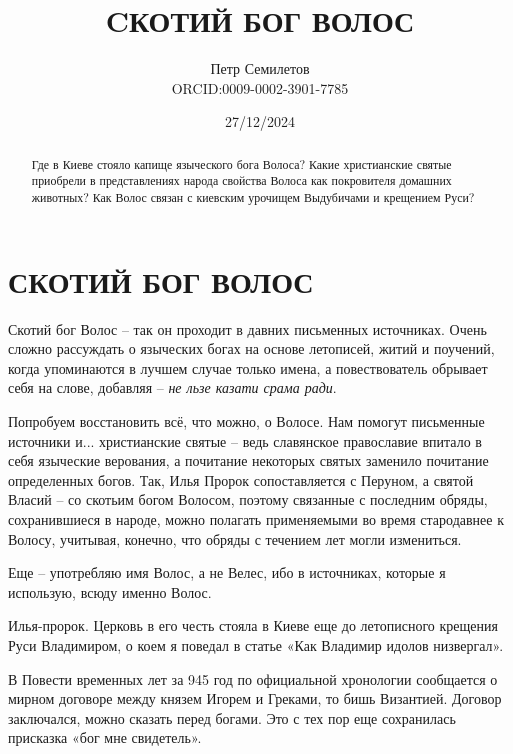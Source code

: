 \documentclass[a5paper,11pt,openany]{article}
\title{CКОТИЙ БОГ ВОЛОС\\
\textsmaller[2]{редакция 1.0}}
\author{Петр Семилетов\\ORCID:0009-0002-3901-7785 \orcidlink{0009-0002-3901-7785}}
\date{27/12/2024}
\begin{document}
\maketitle

\pagestyle{empty}


\newpage

\pagestyle{plain}



%
%
%

\begin{abstract}
Где в Киеве стояло капище языческого бога Волоса? Какие христианские святые приобрели в представлениях народа свойства Волоса как покровителя домашних животных? Как Волос связан с киевским урочищем Выдубичами и крещением Руси?
\end{abstract}


\section{СКОТИЙ БОГ ВОЛОС}

   Скотий бог Волос – так он проходит в давних письменных источниках. Очень сложно рассуждать о языческих богах на основе летописей, житий и поучений, когда упоминаются в лучшем случае только имена, а повествователь обрывает себя на слове, добавляя – \textit{не льзе казати срама ради}.

   Попробуем восстановить всё, что можно, о Волосе. Нам помогут письменные источники и... христианские святые – ведь славянское православие впитало в себя языческие верования, а почитание некоторых святых заменило почитание определенных богов. Так, Илья Пророк сопоставляется с Перуном, а святой Власий – со скотьим богом Волосом, поэтому связанные с последним обряды, сохранившиеся в народе, можно полагать применяемыми во время стародавнее к Волосу, учитывая, конечно, что обряды с течением лет могли измениться.

Еще – употребляю имя Волос, а не Велес, ибо в источниках, которые я использую, всюду именно Волос.

Илья-пророк. Церковь в его честь стояла в Киеве еще до летописного крещения Руси Владимиром, о коем я поведал в статье «Как Владимир идолов низвергал»\cite{semiletov-kak}.  

В Повести временных лет за 945 год по официальной хронологии сообщается о мирном договоре между князем Игорем и Греками, то бишь Византией. Договор заключался, можно сказать перед богами. Это с тех пор еще сохранилась присказка «бог мне свидетель».
\end{document}
